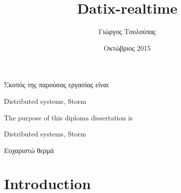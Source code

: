 \documentclass[diploma, english]{softlab-thesis}
\begin{document}

\frontmatter

\title{Datix-realtime}
\author{Γιώργος Τουλούπας}
\date{Οκτώβριος 2015}




\maketitle



\begin{abstractgr}%
Σκοπός της παρούσας εργασίας είναι
\begin{keywordsgr}
Distributed systems, Storm
\end{keywordsgr}
\end{abstractgr}



\begin{abstracten}%
The purpose of this diploma dissertation is
\begin{keywordsen}
Distributed systems, Storm
\end{keywordsen}
\end{abstracten}



\begin{acknowledgementsgr}
Ευχαριστώ θερμά
\end{acknowledgementsgr}



\tableofcontents
\listoftables
\listoffigures



\mainmatter

\chapter{Introduction}

\end{document}
